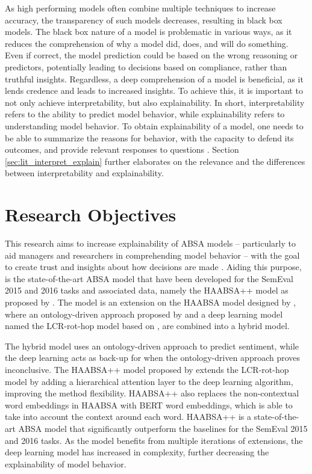 As high performing models often combine multiple techniques to increase accuracy, the transparency of such models decreases, resulting in black box models. The black box nature of a model is problematic in various ways, as it reduces the comprehension of why a model did, does, and will do something. Even if correct, the model prediction could be based on the wrong reasoning or predictors, potentially leading to decisions based on compliance, rather than truthful insights. Regardless, a deep comprehension of a model is beneficial, as it lends credence and leads to increased insights. To achieve this, it is important to not only achieve interpretability, but also explainability. In short, interpretability refers to the ability to predict model behavior, while explainability refers to understanding model behavior. To obtain explainability of a model, one needs to be able to summarize the reasons for behavior, with the capacity to defend its outcomes, and provide relevant responses to questions \cite{Gilpin}. Section \ref{sec:lit_interpret_explain} further elaborates on the relevance and the differences between interpretability and explainability.

\section{Research Objectives}
\label{sect:intro_objectives}
This research aims to increase explainability of ABSA models -- particularly to aid managers and researchers in comprehending model behavior -- with the goal to create trust and insights about how decisions are made \cite{Gilpin}. Aiding this purpose, is the state-of-the-art ABSA model that have been developed for the SemEval 2015 and 2016 tasks and associated data, namely the HAABSA++ model as proposed by \cite{Trusca}. The model is an extension on the HAABSA model designed by \cite{Wallaart}, where an ontology-driven approach proposed by \cite{Schouten} and a deep learning model named the LCR-rot-hop model based on \cite{Zheng}, are combined into a hybrid model.

The hybrid model uses an ontology-driven approach to predict sentiment, while the deep learning acts as back-up for when the ontology-driven approach proves inconclusive. The HAABSA++ model proposed by \cite{Trusca} extends the LCR-rot-hop model by adding a hierarchical attention layer to the deep learning algorithm, improving the method flexibility. HAABSA++ also replaces the non-contextual word embeddings in HAABSA with BERT word embeddings, which is able to take into account the context around each word. HAABSA++ is a state-of-the-art ABSA model that significantly outperform the baselines for the SemEval 2015 and 2016 tasks. As the model benefits from multiple iterations of extensions, the deep learning model has increased in complexity, further decreasing the explainability of model behavior.

